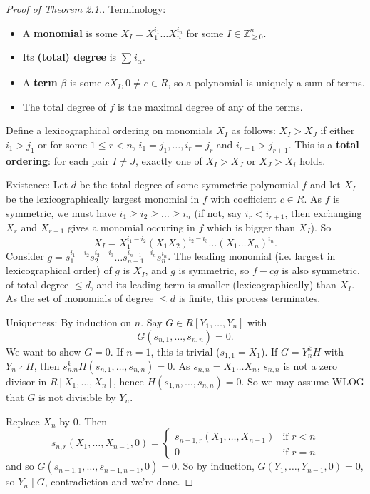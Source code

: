 \documentclass{article}
\theoremstyle{definition}
\begin{document}
\begin{proof}[Proof of Theorem 2.1.]
    Terminology: 
    \begin{itemize}
        \item A \textbf{monomial} is some $X_{I} = X_1^{i_1}\ldots X_n^{i_n}$ for some $I \in \mathbb{Z}_{\ge 0}^n$.
        \item Its \textbf{(total) degree} is $\sum_{}^{} i_\alpha$.
        \item A \textbf{term} $\beta$ is some $c X_I, 0 \neq c \in R$, so a polynomial is uniquely a sum of terms.
        \item The total degree of $f$ is the maximal degree of any of the terms. 
    \end{itemize}   

    Define a lexicographical ordering on monomials $X_I$ as follows: $X_I > X_J$ if either $i_1 > j_1$ or for some $1 \le r < n$, $i_1=j_1,\ldots, i_r = j_r$ and $i_{r+1} > j_{r+1}$. This is a \textbf{total ordering}: for each pair $I \neq J$, exactly one of $X_I > X_J$ or $X_J > X_i$ holds.

    Existence: Let $d$ be the total degree of some symmetric polynomial $f$ and let $X_I$ be the lexicographically largest monomial in $f$ with coefficient $c \in R$. As $f$ is symmetric, we must have $i_1\ge i_2 \ge \ldots \ge i_n$ (if not, say $i_r < i_{r+1}$, then exchanging $X_r$ and $X_{r+1}$ gives a monomial occuring in $f$ which is bigger than $X_I$). 
    So $$X_I = X_1^{i_1-i_2}(X_1X_2)^{i_2-i_3}\ldots(X_1\ldots X_n)^{i_n}.$$
    Consider $g = s_1^{i_1-i_2}s_2^{i_2-i_3}\ldots s_{n-1}^{i_{n-1}-i_n}s_n^{i_n}$. The leading monomial (i.e. largest in lexicographical order) of $g$ is $X_I$, and $g$ is symmetric, so $f-cg$ is also symmetric, of total degree $\le d$, and its leading term is smaller (lexicographically) than $X_I$. As the set of monomials of degree $\le d$ is finite, this process terminates.

    \vspace{1mm}
    
    Uniqueness: By induction on $n$. Say $G \in R[Y_1,\ldots,Y_n]$ with $$G(s_{n,1},\ldots,s_{n,n}) = 0.$$ We want to show $G = 0$. If $n=1$, this is trivial ($s_{1,1} = X_1$). If $G = Y_n^k H$ with $Y_n \nmid H$, then $s_{n.n}^k H(s_{n,1},\ldots,s_{n,n}) = 0$. As $s_{n,n} = X_1\ldots X_n$, $s_{n,n}$ is not a zero divisor in $R[X_1,\ldots,X_n]$, hence $H(s_{1,n},\ldots,s_{n,n}) = 0$. So we may assume WLOG that $G$ is not divisible by $Y_n$.

    Replace $X_n$ by 0. Then $$s_{n,r}(X_1,\ldots,X_{n-1},0) = \begin{cases}
        s_{n-1,r}(X_1, \ldots, X_{n-1}) &\text{if }r<n \\
        0 &\text{if } r=n
    \end{cases}$$
    and so $G(s_{n-1,1},\ldots,s_{n-1,n-1},0) = 0$. So by induction, $G(Y_1, \ldots, Y_{n-1}, 0) = 0$, so $Y_n \mid G$, contradiction and we're done.
\end{proof}
\end{document}
